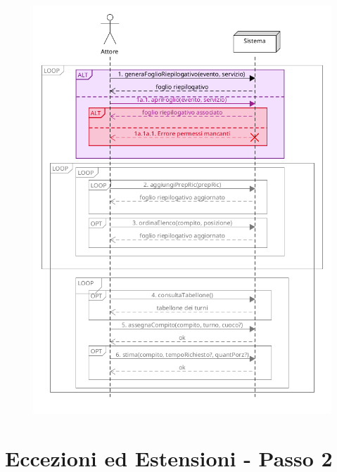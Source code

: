 \begin{figure}[h]
  \begin{center}
    \includegraphics[scale = 0.53]{images/SSD/SSD - passo 1.png}
  \end{center}
\end{figure}

\pagebreak

\section{Eccezioni ed Estensioni - Passo 2}


